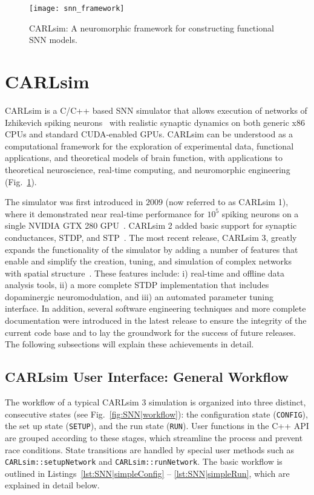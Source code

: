 \begin{figure}[t]
  \centering
  \texttt{[image: snn\_framework]}
  \caption{CARLsim: A neuromorphic framework for constructing functional
  \ac{SNN} models.}
  \label{fig:SNN|framework}
\end{figure}

\section{CARLsim}
CARLsim is a C/C++ based \ac{SNN} simulator that allows execution of networks
of Izhikevich spiking neurons~\citep{Izhikevich2003} with realistic
synaptic dynamics on both generic x86 \acp{CPU} and standard 
\ac{CUDA}-enabled \acp{GPU}.
CARLsim can be understood as a computational framework
for the exploration of experimental data, functional applications, and
theoretical models of brain function,
with applications to theoretical neuroscience, real-time computing,
and neuromorphic engineering (Fig.~\ref{fig:SNN|framework}).

The simulator was first introduced in $2009$ (now referred to
as CARLsim 1), where it demonstrated near real-time
performance for $10^5$ spiking neurons on a single NVIDIA
GTX 280 \ac{GPU}~\citep{Nageswaran2009}.
CARLsim 2 added basic support for
synaptic conductances, \ac{STDP}, and \ac{STP}~\citep{Richert2011}.
The most recent release, CARLsim 3, greatly expands the functionality of the
simulator by adding a number of features that enable and
simplify the creation, tuning, and simulation of complex
networks with spatial structure~\citep{Beyeler2015a}.
These features include: i)
real-time and offline data analysis tools, ii) a more complete
\ac{STDP} implementation that includes dopaminergic neuromodulation,
and iii) an automated parameter tuning interface.
In addition, several software engineering techniques and more
complete documentation were introduced in the latest release
to ensure the integrity of the current code base and to lay the
groundwork for the success of future releases. The following
subsections will explain these achievements in detail.


\subsection{CARLsim User Interface: General Workflow}
\label{sec:SNN|API}
The workflow of a typical CARLsim 3 simulation is organized
into three distinct, consecutive states (see Fig.~\ref{fig:SNN|workflow}):
the configuration state (\texttt{CONFIG}),
the set up state (\texttt{SETUP}), and the
run state (\texttt{RUN}). User functions in the C++ \ac{API} are grouped
according to these stages, which streamline the process and
prevent race conditions. State transitions are handled by
special user methods such as
\texttt{CARLsim::setupNetwork} and \texttt{CARLsim::runNetwork}.
The basic workflow is outlined in
Listings~\ref{lst:SNN|simpleConfig} -- \ref{lst:SNN|simpleRun},
which are explained in detail below.

